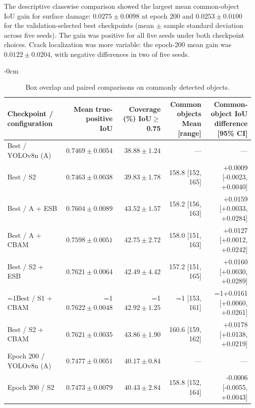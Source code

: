 \documentclass[energies,article,submit,pdftex,moreauthors]{Definitions/mdpi}
\providecommand{\revisionmode}{0}
\newcommand{\rev}[1]{\ifnum\revisionmode=1\relax{\color{red}#1}\else#1\fi}
\begin{document}
The descriptive classwise comparison showed the largest mean common-object IoU gain for surface damage: $0.0275 \pm 0.0098$ at epoch 200 and $0.0253 \pm 0.0100$ for the validation-selected best checkpoints (mean $\pm$ sample standard deviation across five seeds). The gain was positive for all five seeds under both checkpoint choices. Crack localization was more variable: the epoch-200 mean gain was $0.0122 \pm 0.0204$, with negative differences in two of five seeds.
\begin{table}[H]
\begin{adjustwidth}{-\extralength}{0cm}
\caption{Box overlap and paired comparisons on commonly detected objects.}\label{tab:loc_v12}
\centering\small\setlength{\tabcolsep}{4pt}
\begin{adjustbox}{max width=\fulllength}
\begin{tabular}{lrrrr}
\toprule
Checkpoint / configuration & \shortstack{Mean true-positive\\IoU} & \shortstack{Coverage (\%)\\IoU$\geq$0.75} & \shortstack{Common objects\\Mean [range]} & \shortstack{Common-object IoU\\difference [95\% CI]} \\
\midrule
Best / YOLOv8n (A) & $0.7469 \pm 0.0054$ & $38.88 \pm 1.24$ & --- & --- \\
Best / S2 & $0.7463 \pm 0.0038$ & $39.83 \pm 1.78$ & 158.8 [152, 165] & +0.0009 [-0.0023, +0.0040] \\
Best / A + ESB & $0.7604 \pm 0.0089$ & $43.52 \pm 1.57$ & 158.2 [156, 163] & +0.0159 [+0.0033, +0.0284] \\
Best / A + CBAM & $0.7598 \pm 0.0051$ & $42.75 \pm 2.72$ & 158.0 [151, 163] & +0.0127 [+0.0012, +0.0242] \\
Best / S2 + ESB & $0.7621 \pm 0.0064$ & $42.49 \pm 4.42$ & 157.2 [151, 165] & +0.0160 [+0.0030, +0.0289] \\
\rev{Best / S1 + CBAM} & \rev{$0.7622 \pm 0.0048$} & \rev{$42.92 \pm 1.25$} & \rev{157.4 [153, 161]} & \rev{+0.0161 [+0.0060, +0.0261]} \\
Best / S2 + CBAM & $0.7621 \pm 0.0035$ & $43.86 \pm 1.90$ & 160.6 [159, 162] & +0.0178 [+0.0138, +0.0219] \\
Epoch 200 / YOLOv8n (A) & $0.7477 \pm 0.0051$ & $40.17 \pm 0.84$ & --- & --- \\
Epoch 200 / S2 & $0.7473 \pm 0.0079$ & $40.43 \pm 2.84$ & 158.8 [152, 164] & -0.0006 [-0.0055, +0.0043] \\

\end{tabular}
\end{adjustbox}
\end{adjustwidth}
\end{table}
\end{document}
